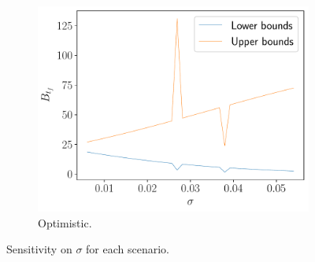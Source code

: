 \documentclass[11pt]{article}
\theoremstyle{definition}
\theoremstyle{remark}
\theoremstyle{remark}
\begin{document}
\begin{figure}[H]
\begin{subfigure}[b]{0.45\textwidth}
      \includegraphics[scale=0.45]{sens_optimistic.pdf}
      \caption{Optimistic.}
  \end{subfigure}
  \caption{Sensitivity on $\sigma$ for each scenario.}
\end{figure}
\end{document}
